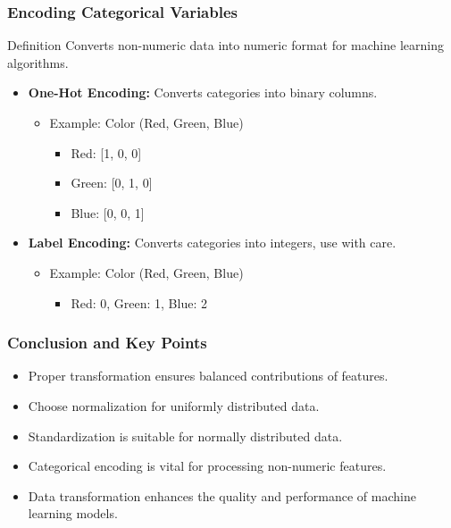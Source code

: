 \documentclass{beamer}
\begin{document}
\begin{frame}[fragile]
    \frametitle{Encoding Categorical Variables}
    \begin{block}{Definition}
        Converts non-numeric data into numeric format for machine learning algorithms.
    \end{block}
    
    \begin{itemize}
        \item \textbf{One-Hot Encoding:} Converts categories into binary columns.
        \begin{itemize}
            \item Example: Color (Red, Green, Blue) 
            \begin{itemize}
                \item Red: [1, 0, 0]
                \item Green: [0, 1, 0]
                \item Blue: [0, 0, 1]
            \end{itemize}
        \end{itemize}
        \item \textbf{Label Encoding:} Converts categories into integers, use with care.
        \begin{itemize}
            \item Example: Color (Red, Green, Blue)
            \begin{itemize}
                \item Red: 0, Green: 1, Blue: 2
            \end{itemize}
        \end{itemize}
    \end{itemize}
\end{frame}

\begin{frame}[fragile]
    \frametitle{Conclusion and Key Points}
    \begin{itemize}
        \item Proper transformation ensures balanced contributions of features.
        \item Choose normalization for uniformly distributed data.
        \item Standardization is suitable for normally distributed data.
        \item Categorical encoding is vital for processing non-numeric features.
        \item Data transformation enhances the quality and performance of machine learning models.
    \end{itemize}
\end{frame}
\end{document}

